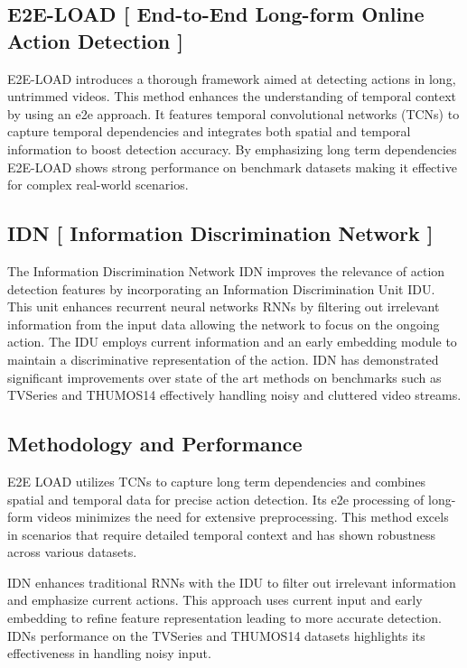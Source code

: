{

\subsection{E2E-LOAD [ End-to-End Long-form Online Action Detection ]
}
E2E-LOAD introduces a thorough framework aimed at detecting actions in long, untrimmed videos. This method enhances the understanding of temporal context by using an e2e approach. It features temporal convolutional networks (TCNs) to capture temporal dependencies and integrates both spatial and temporal information to boost detection accuracy. By emphasizing long term dependencies  E2E-LOAD shows strong performance on benchmark datasets making it effective for complex real-world scenarios.

\subsection{IDN [ Information Discrimination Network ]
}
The Information Discrimination Network IDN improves the relevance of action detection features by incorporating an Information Discrimination Unit IDU. This unit enhances recurrent neural networks RNNs by filtering out irrelevant information from the input data allowing the network to focus on the ongoing action. The IDU employs current information and an early embedding module to maintain a discriminative representation of the action. IDN has demonstrated significant improvements over state of the art methods on benchmarks such as TVSeries and THUMOS14 effectively handling noisy and cluttered video streams.

\subsection{Methodology and Performance
}

E2E LOAD utilizes TCNs to capture long term dependencies and combines spatial and temporal data for precise action detection. Its e2e processing of long-form videos minimizes the need for extensive preprocessing. This method excels in scenarios that require detailed temporal context and has shown robustness across various datasets.
  
IDN enhances traditional RNNs with the IDU to filter out irrelevant information and emphasize current actions. This approach uses current input and early embedding to refine feature representation leading to more accurate detection. IDNs performance on the TVSeries and THUMOS14 datasets highlights its effectiveness in handling noisy input.

}

